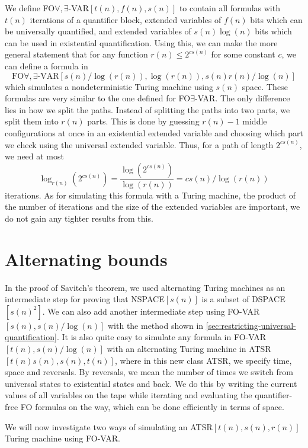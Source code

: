 We define FO$\forall, \exists$-VAR$[t(n), f(n), s(n)]$ to contain all formulas with $t(n)$ iterations of a quantifier block, extended variables of $f(n)$ bits which can be universally quantified, and extended variables of $s(n)\log(n)$ bits which can be used in existential quantification.
Using this, we can make the more general statement that for any function $r(n) \leq 2^{cs(n)}$ for some constant $c$, we can define a formula in \[\text{FO$\forall, \exists$-VAR$[s(n)/\log(r(n)), \log(r(n)), s(n)r(n)/\log(n)]$}\] which simulates a nondeterministic Turing machine using $s(n)$ space.
These formulas are very similar to the one defined for FO$\exists$-VAR\@.
The only difference lies in how we split the paths.
Instead of splitting the paths into two parts, we split them into $r(n)$ parts.
This is done by guessing $r(n) - 1$ middle configurations at once in an existential extended variable and choosing which part we check using the universal extended variable.
Thus, for a path of length $2^{cs(n)}$, we need at most \[\log_{r(n)}\left(2^{cs(n)}\right) = \frac{\log\left(2^{cs(n)}\right)}{\log(r(n))} = cs(n)/\log(r(n))\] iterations.
As for simulating this formula with a Turing machine, the product of the number of iterations and the size of the extended variables are important, we do not gain any tighter results from this.


\section{Alternating bounds}\label{sec:alternating-bounds}

In the proof of Savitch's theorem, we used alternating Turing machines as an intermediate step for proving that NSPACE$[s(n)]$ is a subset of DSPACE$[s(n)^2]$.
We can also add another intermediate step using FO-VAR$[s(n), s(n)/\log(n)]$ with the method shown in \cref{sec:restricting-universal-quantification}.
It is also quite easy to simulate any formula in FO-VAR$[t(n), s(n)/\log(n)]$ with an alternating Turing machine in ATSR$[t(n)s(n), s(n), t(n)]$, where in this new class ATSR, we specify time, space and reversals.
By reversals, we mean the number of times we switch from universal states to existential states and back.
We do this by writing the current values of all variables on the tape while iterating and evaluating the quantifier-free FO formulas on the way, which can be done efficiently in terms of space.

We will now investigate two ways of simulating an ATSR$[t(n), s(n), r(n)]$ Turing machine using FO-VAR\@.

